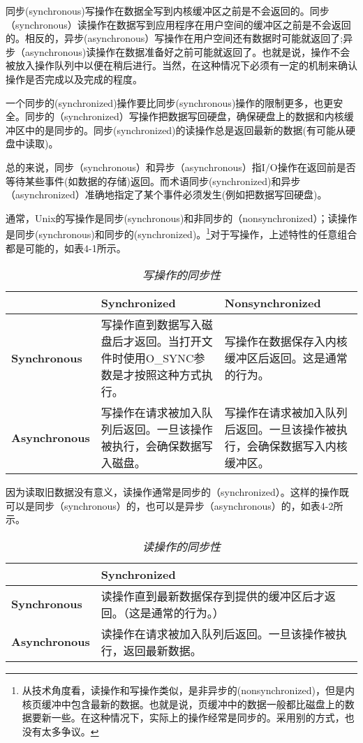 同步(synchronous)写操作在数据全写到内核缓冲区之前是不会返回的。同步（synchronous）读操作在数据写到应用程序在用户空间的缓冲区之前是不会返回的。相反的，异步(asynchronous）写操作在用户空间还有数据时可能就返回了;异步（asynchronous)读操作在数据准备好之前可能就返回了。也就是说，操作不会被放入操作队列中以便在稍后进行。当然，在这种情况下必须有一定的机制来确认操作是否完成以及完成的程度。

一个同步的(synchronized)操作要比同步(synchronous)操作的限制更多，也更安全。同步的（synchronized）写操作把数据写回硬盘，确保硬盘上的数据和内核缓冲区中的是同步的。同步(synchronized)的读操作总是返回最新的数据(有可能从硬盘中读取)。

总的来说，同步（synchronous）和异步（asynchronous）指I/O操作在返回前是否等待某些事件(如数据的存储)返回。而术语同步(synchronized)和异步（asynchronized）准确地指定了某个事件必须发生(例如把数据写回硬盘)。

通常，Unix的写操作是同步(synchronous)和非同步的（nonsynchronized）；读操作是同步(synchronous)和同步的(synchronized)。\footnote[1]{从技术角度看，读操作和写操作类似，是非异步的(nonsynchronized)，但是内核页缓冲中包含最新的数据。也就是说，页缓冲中的数据一般都比磁盘上的数据要新一些。在这种情况下，实际上的操作经常是同步的。采用别的方式，也没有太多争议。}对于写操作，上述特性的任意组合都是可能的，如表4-1所示。

\begin{table}[htp]
\caption{\emph{写操作的同步性}}
\begin{tabular}{p{2.5cm}p{5.5cm}p{5.5cm}}\toprule
\rowcolor[gray]{.9}
 & \textbf{Synchronized} & \textbf{Nonsynchronized} \\ \midrule
\textbf{Synchronous} & 写操作直到数据写入磁盘后才返回。当打开文件时使用O\_SYNC参数是才按照这种方式执行。 & 写操作在数据保存入内核缓冲区后返回。这是通常的行为。 \\
\textbf{Asynchronous} & 写操作在请求被加入队列后返回。一旦该操作被执行，会确保数据写入磁盘。 & 写操作在请求被加入队列后返回。一旦该操作被执行，会确保数据写入内核缓冲区。\\ \bottomrule
\end{tabular}
\end{table}

因为读取旧数据没有意义，读操作通常是同步的（synchronized）。这样的操作既可以是同步（synchronous）的，也可以是异步（asynchronous）的，如表4-2所示。

\begin{table}[htp]
\caption{\emph{读操作的同步性}}
\begin{tabular}{p{2.5cm}p{11.5cm}}\toprule
\rowcolor[gray]{.9}
 & \textbf{Synchronized} \\ \midrule
 \textbf{Synchronous} & 读操作直到最新数据保存到提供的缓冲区后才返回。（这是通常的行为。） \\
 \textbf{Asynchronous} & 读操作在请求被加入队列后返回。一旦该操作被执行，返回最新数据。 \\ \bottomrule
\end{tabular}
\end{table}

